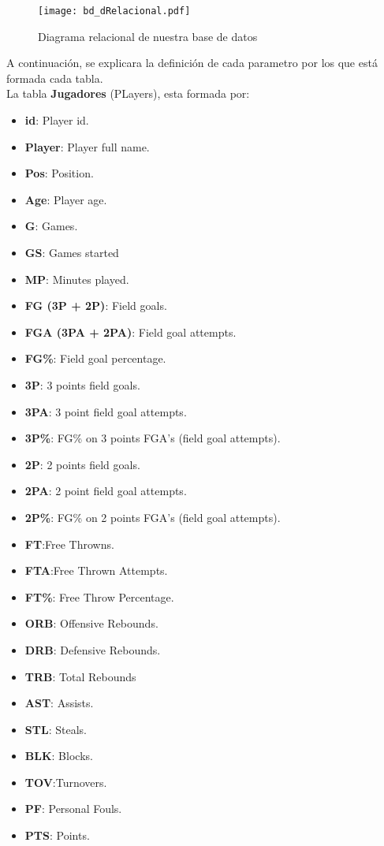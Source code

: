 \documentclass[11pt]{diazessay} %
\begin{document}
\begin{figure}[h!]
	\centering
	\texttt{[image: bd\_dRelacional.pdf]}
	\caption{Diagrama relacional de nuestra base de datos}
	\label{fig:diagrama}
\end{figure}

A continuación, se explicara la definición de cada parametro por los que está formada cada tabla.\\

La tabla \textbf{Jugadores} (PLayers), esta formada por:
\begin{itemize}
	\item \textbf{id}: Player id.
	\item \textbf{Player}: Player full name.
	\item \textbf{Pos}: Position.
	\item \textbf{Age}: Player age.
	\item \textbf{G}: Games.
	\item \textbf{GS}: Games started
	\item \textbf{MP}: Minutes played.
	\item \textbf{FG (3P + 2P)}: Field goals.
	\item \textbf{FGA (3PA + 2PA)}: Field goal attempts.
	\item \textbf{FG\%}: Field goal percentage.
	\item \textbf{3P}: 3 points field goals.
	\item \textbf{3PA}: 3 point field goal attempts.
	\item \textbf{3P\%}: FG\% on 3 points FGA's (field goal attempts).
	\item \textbf{2P}: 2 points field goals.	
	\item \textbf{2PA}: 2 point field goal attempts.
	\item \textbf{2P\%}: FG\% on 2 points FGA's (field goal attempts).
	\item \textbf{FT}:Free Throwns.
	\item \textbf{FTA}:Free Thrown Attempts.
	\item \textbf{FT\%}: Free Throw Percentage.
	\item\textbf{ORB}: Offensive Rebounds.
	\item\textbf{DRB}: Defensive Rebounds.
	\item\textbf{TRB}: Total Rebounds
	\item\textbf{AST}: Assists.
	\item\textbf{STL}: Steals.
	\item\textbf{BLK}: Blocks.
	\item\textbf{TOV}:Turnovers.
	\item\textbf{PF}: Personal Fouls.
	\item\textbf{PTS}: Points.
\end{itemize}
\end{document}
